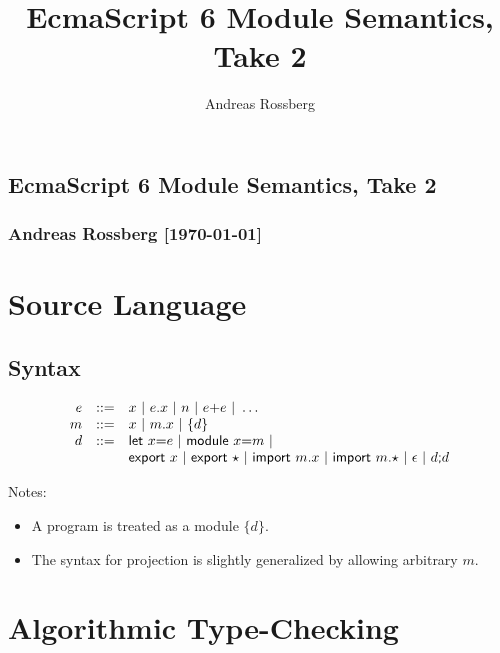 \documentclass[10pt,a4paper]{article}
\title{EcmaScript 6 Module Semantics, Take 2}
\author{Andreas Rossberg}
\newcommand\K[1]{\ensuremath{\textsf{#1}}}
\newcommand\note[1]{\noindent #1}
\begin{document}

\begin{center}
\section*{\textsf{EcmaScript 6 Module Semantics, Take 2}}
\subsubsection*{Andreas Rossberg [\today]}
\end{center}


\section{Source Language}

\subsection*{Syntax}

$$
\begin{array}{@{}rcl@{}}
e &::=& x ~|~ e\K.x ~|~ n ~|~ e\K+e ~|~ \dots \\
m &::=& x ~|~ m\K.x ~|~ \{d\} \\
d &::=& \K{let}~x\K=e ~|~ \K{module}~x\K=m ~|~ \\&& \K{export}~x ~|~ \K{export}~{\star} ~|~ \K{import}~m\K.x ~|~ \K{import}~m\K.{\star}
  ~|~ \epsilon ~|~ d\K;d \\
\end{array}
$$

\note{
Notes:
\begin{itemize}
\item A program is treated as a module $\{d\}$.
\item The syntax for projection is slightly generalized by allowing arbitrary $m$.
\end{itemize}
}



\section{Algorithmic Type-Checking}
\end{document}
